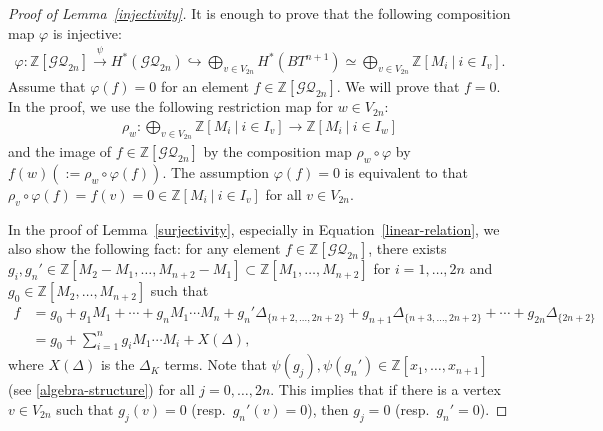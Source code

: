 \documentclass[12pt]{amsart}
\theoremstyle{remark}
\numberwithin{equation}{section}
\begin{document}
\begin{proof}[Proof of Lemma~\ref{injectivity}]
It is enough to prove that the following composition map $\varphi$ is injective:
\begin{align*}
\varphi:\mathbb{Z}[\mathcal{GQ}_{2n}]\stackrel{\psi}{\longrightarrow} H^{*}(\mathcal{GQ}_{2n})\hookrightarrow \bigoplus_{v\in V_{2n}}H^{*}(BT^{n+1}) 
\simeq \bigoplus_{v\in V_{2n}}\mathbb{Z}[M_{i}\ |\ i\in I_{v}].
\end{align*}
Assume that $\varphi(f)=0$ for an element $f\in \mathbb{Z}[\mathcal{GQ}_{2n}]$. 
We will prove that $f=0$.
In the proof, we use the following restriction map for $w\in V_{2n}$: 
\begin{align*}
\rho_{w}:%
\bigoplus_{v\in V_{2n}}\mathbb{Z}[M_{i}\ |\ i\in I_{v}]
\to \mathbb{Z}[M_{i}\ |\ i\in I_{w}]
\end{align*}
and the image of $f\in \mathbb{Z}[\mathcal{GQ}_{2n}]$ by the composition map $\rho_{w}\circ \varphi$ by $f(w)(:=\rho_{w}\circ \varphi(f))$.
The assumption $\varphi(f)=0$ is equivalent to that $\rho_{v}\circ \varphi(f)=f(v)=0\in \mathbb{Z}[M_{i}\ |\ i\in I_{v}]$ for all $v\in V_{2n}$.

In the proof of Lemma~\ref{surjectivity}, especially in Equation~\eqref{linear-relation}, we also show the following fact: for any element $f\in \mathbb{Z}[\mathcal{GQ}_{2n}]$, there exists $g_{i},g_{n}'\in %
\mathbb{Z}[M_{2}-M_{1},\ldots, M_{n+2}-M_{1}] \subset \mathbb{Z}[M_{1},\ldots, M_{n+2}]$ for $i=1,\ldots, 2n$ and $g_{0}\in \mathbb{Z}[M_{2},\ldots, M_{n+2}]$ such that  
\begin{align}
\label{induction_injective}
f&=g_{0}+g_{1}M_{1}+\cdots +g_{n}M_{1}\cdots M_{n}+g_{n}'\Delta_{\{n+2,\ldots, 2n+2\}}+g_{n+1}\Delta_{\{n+3,\ldots, 2n+2\}}+\cdots 
+g_{2n}\Delta_{\{2n+2\}} \\
&=g_{0}+\sum_{i=1}^{n}{g_{i}}M_{1}\cdots M_{i}+X(\Delta), \nonumber
\end{align}
where $X(\Delta)$ is the $\Delta_{K}$ terms.
Note that $\psi(g_{j}), \psi(g_{n}')\in \mathbb{Z}[x_{1},\ldots, x_{n+1}]$ (see \eqref{algebra-structure}) for all $j=0,\ldots, 2n$.
This implies that if there is a vertex $v\in V_{2n}$ such that $g_{j}(v)=0$ (resp.~$g_{n}'(v)=0$), then $g_{j}=0$ (resp.~$g_{n}'=0$).


\end{proof}
\end{document}
